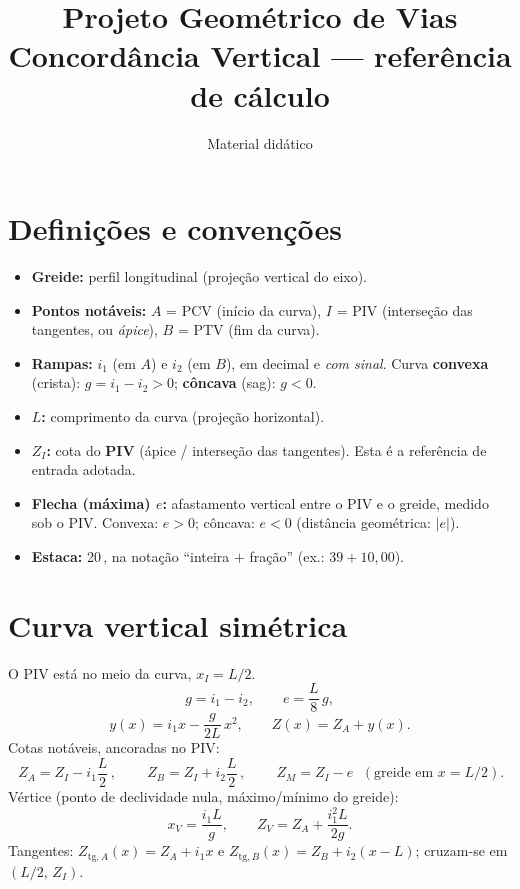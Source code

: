 \documentclass[11pt,a4paper]{article}
\title{Projeto Geométrico de Vias \\ \large Concordância Vertical --- referência de cálculo}
\author{Material didático}
\date{}
\newcommand{\m}{\,\text{m}}
\begin{document}
\maketitle

\section{Definições e convenções}

\begin{itemize}
  \item \textbf{Greide:} perfil longitudinal (projeção vertical do eixo).
  \item \textbf{Pontos notáveis:} $A$ = PCV (início da curva), $I$ = PIV
        (interseção das tangentes, ou \emph{ápice}), $B$ = PTV (fim da curva).
  \item \textbf{Rampas:} $i_1$ (em $A$) e $i_2$ (em $B$), em decimal e \emph{com
        sinal}. Curva \textbf{convexa} (crista): $g=i_1-i_2>0$; \textbf{côncava}
        (sag): $g<0$.
  \item \textbf{$L$:} comprimento da curva (projeção horizontal).
  \item \textbf{$Z_I$:} cota do \textbf{PIV} (ápice / interseção das tangentes).
        Esta é a referência de entrada adotada.
  \item \textbf{Flecha (máxima) $e$:} afastamento vertical entre o PIV e o greide,
        medido sob o PIV. Convexa: $e>0$; côncava: $e<0$ (distância geométrica: $|e|$).
  \item \textbf{Estaca:} 20\m, na notação ``inteira $+$ fração'' (ex.: $39+10{,}00$).
\end{itemize}

\section{Curva vertical simétrica}

O PIV está no meio da curva, $x_I = L/2$.
\[
g = i_1 - i_2, \qquad e = \frac{L}{8}\,g,
\]
\[
y(x) = i_1 x - \frac{g}{2L}\,x^2, \qquad Z(x) = Z_A + y(x).
\]
Cotas notáveis, ancoradas no PIV:
\[
\boxed{\,Z_A = Z_I - i_1\frac{L}{2}\,}, \qquad
\boxed{\,Z_B = Z_I + i_2\frac{L}{2}\,}, \qquad
\boxed{\,Z_M = Z_I - e\,}\ \ (\text{greide em } x=L/2).
\]
Vértice (ponto de declividade nula, máximo/mínimo do greide):
\[
x_V = \frac{i_1 L}{g}, \qquad Z_V = Z_A + \frac{i_1^2 L}{2g}.
\]
Tangentes: $Z_{\mathrm{tg},A}(x)=Z_A+i_1 x$ e $Z_{\mathrm{tg},B}(x)=Z_B+i_2(x-L)$;
cruzam-se em $(L/2,\,Z_I)$.
\end{document}
